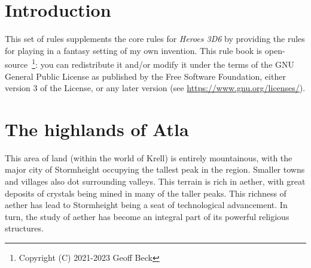 \documentclass[a4paper,11pt,oneside]{book}
\newcommand{\textlf}[1]{\textbf{\titlecap{#1}}}
\begin{document}
%
\chapter{Introduction}
This set of rules supplements the core rules for \textit{Heroes 3D6} by providing the rules for playing in a fantasy setting of my own invention. This rule book is open-source~\footnote{Copyright (C) 2021-2023  Geoff Beck}: you can redistribute it and/or modify
it under the terms of the GNU General Public License as published by
the Free Software Foundation, either version 3 of the License, or any later version (see \url{https://www.gnu.org/licenses/}).


\chapter{The highlands of Atla}
This area of land (within the world of Krell) is entirely mountainous, with the major city of Stormheight occupying the tallest peak in the region. Smaller towns and villages also dot surrounding valleys. This terrain is rich in aether, with great deposits of crystals being mined in many of the taller peaks. This richness of aether has lead to Stormheight being a seat of technological advancement. In turn, the study of aether has become an integral part of its powerful religious structures.  
\end{document}

